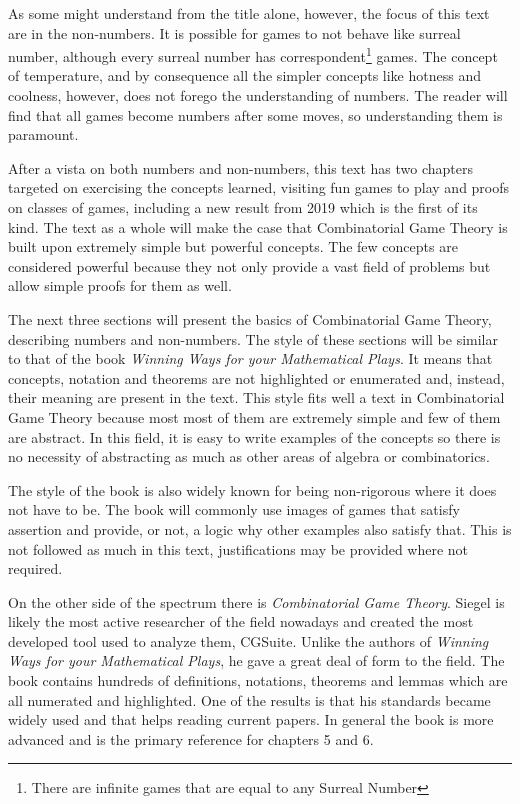 As some might understand from the title alone, however, the focus of this text are in the non-numbers. It is possible for games to not behave like surreal number, although every surreal number has correspondent\footnote{There are infinite games that are equal to any Surreal Number} games. The concept of temperature, and by consequence all the simpler concepts like hotness and coolness, however, does not forego the understanding of numbers. The reader will find that all games become numbers after some moves, so understanding them is paramount.

After a vista on both numbers and non-numbers, this text has two chapters targeted on exercising the concepts learned, visiting fun games to play and proofs on classes of games, including a new result from 2019 which is the first of its kind. The text as a whole will make the case that Combinatorial Game Theory is built upon extremely simple but powerful concepts. The few concepts are considered powerful because they not only provide a vast field of problems but allow simple proofs for them as well.

The next three sections will present the basics of Combinatorial Game Theory, describing numbers and non-numbers. The style of these sections will be similar to that of the book \textit{Winning Ways for your Mathematical Plays}\cite{WW}. It means that concepts, notation and theorems are not highlighted or enumerated and, instead, their meaning are present in the text. This style fits well a text in Combinatorial Game Theory because most most of them are extremely simple and few of them are abstract. In this field, it is easy to write examples of the concepts so there is no necessity of abstracting as much as other areas of algebra or combinatorics.

The style of the book is also widely known for being non-rigorous where it does not have to be. The book will commonly use images of games that satisfy assertion and provide, or not, a logic why other examples also satisfy that. This is not followed as much in this text, justifications may be provided where not required. 

On the other side of the spectrum there is \textit{Combinatorial Game Theory}\cite{CGT}. Siegel is likely the most active researcher of the field nowadays and created the most developed tool used to analyze them, CGSuite. Unlike the authors of \textit{Winning Ways for your Mathematical Plays}, he gave a great deal of form to the field. The book contains hundreds of definitions, notations, theorems and lemmas which are all numerated and highlighted. One of the results is that his standards became widely used and that helps reading current papers. In general the book is more advanced and is the primary reference for chapters 5 and 6.

